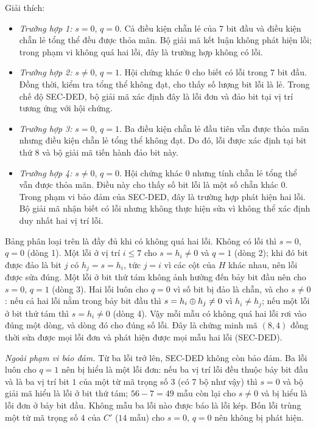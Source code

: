 Giải thích:
\begin{itemize}
  \item \emph{Trường hợp 1:} $s = 0$, $q = 0$. Cả điều kiện chẵn lẻ của $7$
        bit đầu và điều kiện chẵn lẻ tổng thể đều được thỏa mãn. Bộ giải mã kết
        luận không phát hiện lỗi; trong phạm vi không quá hai lỗi, đây là
        trường hợp không có lỗi.
  \item \emph{Trường hợp 2:} $s \neq 0$, $q = 1$. Hội chứng khác $0$ cho biết
        có lỗi trong $7$ bit đầu. Đồng thời, kiểm tra tổng thể không đạt, cho
        thấy số lượng bit lỗi là lẻ. Trong chế độ SEC-DED, bộ giải mã xác định
        đây là lỗi đơn và đảo bit tại vị trí tương ứng với hội chứng.
  \item \emph{Trường hợp 3:} $s = 0$, $q = 1$. Ba điều kiện chẵn lẻ đầu tiên
        vẫn được thỏa mãn nhưng điều kiện chẵn lẻ tổng thể không đạt. Do đó,
        lỗi được xác định tại bit thứ $8$ và bộ giải mã tiến hành đảo bit này.
  \item \emph{Trường hợp 4:} $s \neq 0$, $q = 0$. Hội chứng khác $0$ nhưng
        tính chẵn lẻ tổng thể vẫn được thỏa mãn. Điều này cho thấy số bit lỗi
        là một số chẵn khác $0$. Trong phạm vi bảo đảm của SEC-DED, đây là
        trường hợp phát hiện hai lỗi. Bộ giải mã nhận biết có lỗi nhưng không
        thực hiện sửa vì không thể xác định duy nhất hai vị trí lỗi.
\end{itemize}

Bảng phân loại trên là đầy đủ khi có không quá hai lỗi. Không có lỗi thì
$s = 0$, $q = 0$ (dòng 1). Một lỗi ở vị trí $i \le 7$ cho $s = h_i \neq 0$ và
$q = 1$ (dòng 2); khi đó bit được đảo là bit $j$ có $h_j = s = h_i$, tức
$j = i$ vì các cột của $H$ khác nhau, nên lỗi được sửa đúng. Một lỗi ở bit thứ
tám không ảnh hưởng đến bảy bit đầu nên cho $s = 0$, $q = 1$ (dòng 3). Hai lỗi
luôn cho $q = 0$ vì số bit bị đảo là chẵn, và cho $s \neq 0$: nếu cả hai lỗi
nằm trong bảy bit đầu thì $s = h_i \oplus h_j \neq 0$ vì $h_i \neq h_j$; nếu
một lỗi ở bit thứ tám thì $s = h_i \neq 0$ (dòng 4). Vậy mỗi mẫu có không quá
hai lỗi rơi vào đúng một dòng, và dòng đó cho đúng số lỗi. Đây là chứng minh
mã $(8,4)$ đồng thời sửa được mọi lỗi đơn và phát hiện được mọi mẫu hai lỗi
(SEC-DED).

\emph{Ngoài phạm vi bảo đảm.} Từ ba lỗi trở lên, SEC-DED không còn bảo đảm. Ba
lỗi luôn cho $q = 1$ nên bị
hiểu là một lỗi đơn: nếu ba vị trí lỗi đều thuộc bảy bit đầu và là ba vị trí
bit $1$ của một từ mã trọng số $3$ (có $7$ bộ như vậy) thì $s = 0$ và bộ giải
mã hiểu là lỗi ở bit thứ tám; $56 - 7 = 49$ mẫu còn lại cho $s \neq 0$ và bị
hiểu là lỗi đơn ở bảy bit đầu. Không mẫu ba lỗi nào được báo là lỗi kép. Bốn
lỗi trùng một từ mã trọng số $4$ của $C'$ ($14$ mẫu) cho $s = 0$, $q = 0$ nên
không bị phát hiện.

